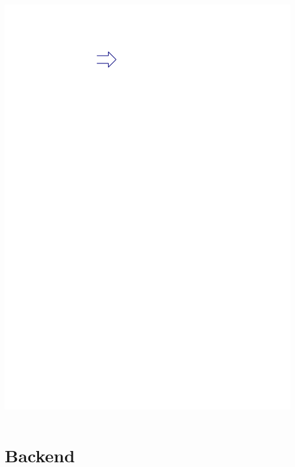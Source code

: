 \documentclass[navbaroff,en]{sdqbeamer}
\begin{document}
\begin{frame}
\begin{columns}
\begin{column}{0.05\textwidth}
			\includegraphics[scale=0.7]{images/arrow.ipe.pdf}
		\end{column}
		\begin{column}{0.15\textwidth}
			\centering
			\scalebox{0.1}{}
		\end{column}
	\end{columns}

\end{frame}






\section{Backend}
\end{document}
